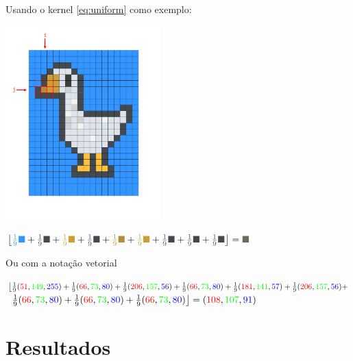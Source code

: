 \documentclass[a4paper, 11pt]{article}
\begin{document}
Usando o kernel \ref{eq:uniform} como exemplo:


\begin{center}
    \begin{minipage}{0.4\textwidth}
        \includegraphics[height=7.5cm]{goose.pdf}
    \end{minipage}
    \begin{minipage}{0.55\textwidth}
        $
        \left\lfloor
        \textcolor{azulfundo}{\frac{1}{9} \blacksquare} +
        \textcolor{cinzaborda}{\frac{1}{9} \blacksquare} +
        \textcolor{bicodois}{\frac{1}{9} \blacksquare} +
        \textcolor{cinzaborda}{\frac{1}{9} \blacksquare} + 
        \textcolor{bicoum}{\frac{1}{9} \blacksquare} + 
        \textcolor{bicodois}{\frac{1}{9} \blacksquare} +
        \textcolor{cinzaborda}{\frac{1}{9} \blacksquare} + 
        \textcolor{cinzaborda}{\frac{1}{9} \blacksquare} + 
        \textcolor{cinzaborda}{\frac{1}{9} \blacksquare}
        \right\rfloor  = \textcolor{novo}{\blacksquare}
        $
    \end{minipage}
\end{center}

Ou com a notação vetorial

$\big\lfloor
\frac{1}{9} (\textcolor{red}{51}, \textcolor{green}{149}, \textcolor{blue}{255}) + 
\frac{1}{9} (\textcolor{red}{66}, \textcolor{green}{73}, \textcolor{blue}{80}) + 
\frac{1}{9} (\textcolor{red}{206}, \textcolor{green}{157}, \textcolor{blue}{56}) + 
\frac{1}{9} (\textcolor{red}{66}, \textcolor{green}{73}, \textcolor{blue}{80}) + 
\frac{1}{9} (\textcolor{red}{181}, \textcolor{green}{141}, \textcolor{blue}{57}) +
\frac{1}{9} (\textcolor{red}{206}, \textcolor{green}{157}, \textcolor{blue}{56}) + 
$\\[3pt]
$\textcolor{white}{\big\lfloor} 
\frac{1}{9} (\textcolor{red}{66}, \textcolor{green}{73}, \textcolor{blue}{80}) + 
\frac{1}{9} (\textcolor{red}{66}, \textcolor{green}{73}, \textcolor{blue}{80}) + 
\frac{1}{9} (\textcolor{red}{66}, \textcolor{green}{73}, \textcolor{blue}{80})
\big\rfloor = 
(\textcolor{red}{108}, \textcolor{green}{107}, \textcolor{blue}{91})
$


\section*{Resultados}


\end{document}
